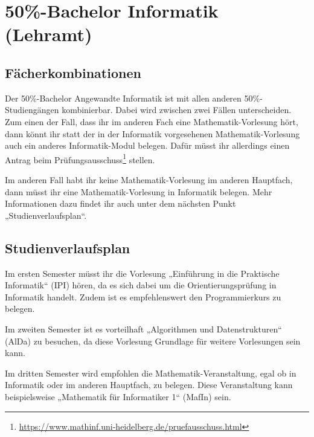 \newpage\section{50\%-Bachelor Informatik (Lehramt)}

\subsection{Fächerkombinationen}
Der 50\%-Bachelor Angewandte Informatik ist mit allen anderen 50\%-Studiengängen kombinierbar. Dabei wird zwischen zwei Fällen unterscheiden. Zum einen der Fall, dass ihr im anderen Fach eine Mathematik-Vorlesung hört, dann könnt ihr statt der in der Informatik vorgesehenen Mathematik-Vorlesung auch ein anderes Informatik-Modul belegen. Dafür müsst ihr allerdings einen Antrag beim Prüfungsausschuss\footnote{\url{https://www.mathinf.uni-heidelberg.de/pruefausschuss.html}} stellen. 

Im anderen Fall habt ihr keine Mathematik-Vorlesung im anderen Hauptfach, dann müsst ihr eine Mathematik-Vorlesung in Informatik belegen. Mehr Informationen dazu findet ihr auch unter dem nächsten Punkt „Studienverlaufsplan“.

\subsection{Studienverlaufsplan}
Im ersten Semester müsst ihr die Vorlesung „Einführung in die Praktische Informatik“ (\gls{IPI}) hören, da es sich dabei um die Orientierungsprüfung in Informatik handelt. Zudem ist es empfehlenswert den Programmierkurs zu belegen. 

Im zweiten Semester ist es vorteilhaft „Algorithmen und Datenstrukturen“ (\gls{AlDa}) zu besuchen, da diese Vorlesung Grundlage für weitere Vorlesungen sein kann. 

Im dritten Semester wird empfohlen die Mathematik-Veranstaltung, egal ob in Informatik oder im anderen Hauptfach, zu belegen. Diese Veranstaltung kann beispielsweise „Mathematik für Informatiker 1“ (\gls{MafIn}) sein.


